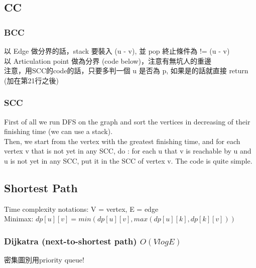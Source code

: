 \documentclass[10pt,oneside]{article}
\begin{document}
\begin{landscape}
\begin{multicols}{2}
\subsection{CC}

\subsubsection{BCC}
{\normalsize 
以 Edge 做分界的話，stack 要裝入 (u - v), 並 pop 終止條件為 != (u - v) \\
以 Articulation point 做為分界 (code below)，注意有無坑人的重邊 \\
注意，用SCC的code的話，只要多判一個 u 是否為 p, 如果是的話就直接 return (加在第21行之後)
}

\subsubsection{SCC}

{\normalsize 
First of all we run DFS on the graph and sort the vertices in decreasing of their finishing time (we can use a stack).\\
Then, we start from the vertex with the greatest finishing time, and for each vertex v that is not yet in any SCC, do : for each u that v is reachable by u and u is not yet in any SCC, put it in the SCC of vertex v. The code is quite simple.
}


\subsection{Shortest Path}

{\normalsize 
Time complexity notations: V = vertex, E = edge \\
Minimax: $dp[u][v] = min(dp[u][v], max(dp[u][k], dp[k][v]))$ \\
}


\subsubsection{Dijkatra (next-to-shortest path) $O(VlogE)$}
{\normalsize 密集圖別用priority queue! }


\end{multicols}
\end{landscape}
\end{document}
